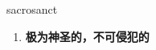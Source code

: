 
\begin{frame}
{\huge sacrosanct}
\begin{center}
\begin{enumerate}\Large
  \item \textbf{极为神圣的，不可侵犯的}
\end{enumerate}
\end{center}
\end{frame}
